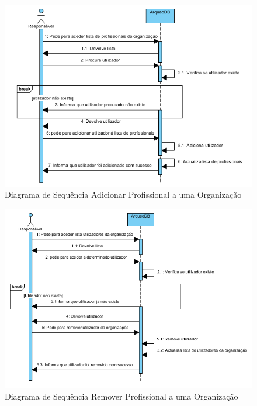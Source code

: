 ﻿\documentclass[12pt,a4paper]{article}
\begin{document}
\begin{figure}[h!]
\centering
\includegraphics[scale=1]{sequencia/adicionarprofissional}
\caption{Diagrama de Sequência Adicionar Profissional a uma Organização} 
\end{figure}  


\begin{figure}[h!]
\centering
\includegraphics[scale=1]{sequencia/removerutilizador}
\caption{Diagrama de Sequência Remover Profissional a uma Organização} 
\end{figure}  
\end{document}
